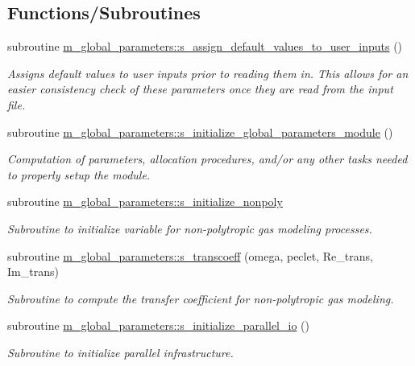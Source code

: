 \subsection*{Functions/\+Subroutines}
\begin{DoxyCompactItemize}
\item 
subroutine \hyperlink{namespacem__global__parameters_a433eac37597eb46a3cac84ca0471f5d3}{m\+\_\+global\+\_\+parameters\+::s\+\_\+assign\+\_\+default\+\_\+values\+\_\+to\+\_\+user\+\_\+inputs} ()
\begin{DoxyCompactList}\small\item\em Assigns default values to user inputs prior to reading them in. This allows for an easier consistency check of these parameters once they are read from the input file. \end{DoxyCompactList}\item 
subroutine \hyperlink{namespacem__global__parameters_a8a76198d180cb9736c21dde108cb0dbf}{m\+\_\+global\+\_\+parameters\+::s\+\_\+initialize\+\_\+global\+\_\+parameters\+\_\+module} ()
\begin{DoxyCompactList}\small\item\em Computation of parameters, allocation procedures, and/or any other tasks needed to properly setup the module. \end{DoxyCompactList}\item 
subroutine \hyperlink{namespacem__global__parameters_a1611e2cf82243c04b04a11281ef67993}{m\+\_\+global\+\_\+parameters\+::s\+\_\+initialize\+\_\+nonpoly}
\begin{DoxyCompactList}\small\item\em Subroutine to initialize variable for non-\/polytropic gas modeling processes. \end{DoxyCompactList}\item 
subroutine \hyperlink{namespacem__global__parameters_af52b102f1c17e28aa4ca3070f8806ca6}{m\+\_\+global\+\_\+parameters\+::s\+\_\+transcoeff} (omega, peclet, Re\+\_\+trans, Im\+\_\+trans)
\begin{DoxyCompactList}\small\item\em Subroutine to compute the transfer coefficient for non-\/polytropic gas modeling. \end{DoxyCompactList}\item 
subroutine \hyperlink{namespacem__global__parameters_a54905a7a2ce9e15fc33ebac52c0d3c27}{m\+\_\+global\+\_\+parameters\+::s\+\_\+initialize\+\_\+parallel\+\_\+io} ()
\begin{DoxyCompactList}\small\item\em Subroutine to initialize parallel infrastructure. \end{DoxyCompactList}\item 

\end{DoxyCompactItemize}

